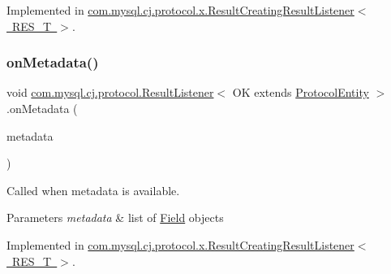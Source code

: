 Implemented in \mbox{\hyperlink{classcom_1_1mysql_1_1cj_1_1protocol_1_1x_1_1_result_creating_result_listener_af44c32d4ea694aea93998ebbba341605}{com.\+mysql.\+cj.\+protocol.\+x.\+Result\+Creating\+Result\+Listener$<$ R\+E\+S\+\_\+\+T $>$}}.

\mbox{\label{interfacecom_1_1mysql_1_1cj_1_1protocol_1_1_result_listener_a7252b90a18c4d3dc585cb7ded00b06f9}} 
\subsubsection{\texorpdfstring{on\+Metadata()}{onMetadata()}}
{\footnotesize\ttfamily void \mbox{\hyperlink{interfacecom_1_1mysql_1_1cj_1_1protocol_1_1_result_listener}{com.\+mysql.\+cj.\+protocol.\+Result\+Listener}}$<$ OK extends \mbox{\hyperlink{interfacecom_1_1mysql_1_1cj_1_1protocol_1_1_protocol_entity}{Protocol\+Entity}} $>$.on\+Metadata (\begin{DoxyParamCaption}\item[{\mbox{\hyperlink{interfacecom_1_1mysql_1_1cj_1_1protocol_1_1_column_definition}{Column\+Definition}}}]{metadata }\end{DoxyParamCaption})}

Called when metadata is available.


\begin{DoxyParams}{Parameters}
{\em metadata} & list of \mbox{\hyperlink{}{Field}} objects \\
\hline
\end{DoxyParams}


Implemented in \mbox{\hyperlink{classcom_1_1mysql_1_1cj_1_1protocol_1_1x_1_1_result_creating_result_listener_a453e531bc60f8e74d1f19ae2ddd2fd37}{com.\+mysql.\+cj.\+protocol.\+x.\+Result\+Creating\+Result\+Listener$<$ R\+E\+S\+\_\+\+T $>$}}.

\mbox{\label{interfacecom_1_1mysql_1_1cj_1_1protocol_1_1_result_listener_a5f0cc53ad220c8c4ca450c9dae00de5c}} 
